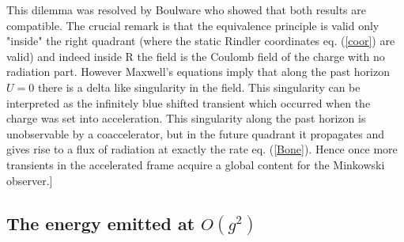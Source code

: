 \documentclass[12pt,oneside]{report}
\begin{document}
This dilemma was resolved by Boulware \cite{Boul2} who showed that both
results are compatible. The crucial remark is that the equivalence principle
is valid only "inside" the right quadrant (where the static Rindler
coordinates  eq. (\ref{coor}) are valid) and indeed inside R the field is the
Coulomb field of the charge with no radiation part. However Maxwell's equations
imply that along the past horizon $U=0$ there is a delta like singularity in the
field. This singularity can be interpreted as the infinitely blue shifted
transient which occurred when the charge was set into acceleration. This
singularity along the past horizon is unobservable by a coaccelerator, but 
in the future quadrant it propagates and gives rise to a
 flux of radiation at exactly the rate  eq. (\ref{Bone}). Hence once more
transients in the accelerated frame acquire a global content for the
Minkowski observer.]

\subsection{The energy emitted at $O(g^2)$}
\end{document}
